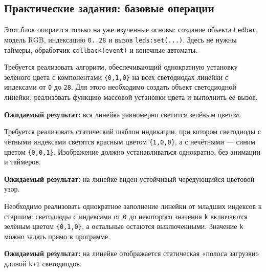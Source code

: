 \subsection{Практические задания: базовые операции}
Этот блок опирается только на уже изученные основы: создание объекта \verb|Ledbar|, модель RGB, индексацию \verb|0..28| и вызов \verb|leds:set(...)|. Здесь не нужны таймеры, обработчик \verb|callback(event)| и конечные автоматы.

\begin{taskbox}
\indent Требуется реализовать алгоритм, обеспечивающий однократную установку зелёного цвета с компонентами \verb|{0,1,0}| на всех светодиодах линейки с индексами от \verb|0| до \verb|28|. Для этого необходимо создать объект светодиодной линейки, реализовать функцию массовой установки цвета и выполнить её вызов.

\noindent\textbf{Ожидаемый результат:} вся линейка равномерно светится зелёным цветом.
\end{taskbox}

\begin{taskbox}
\indent Требуется реализовать статический шаблон индикации, при котором светодиоды с чётными индексами светятся красным цветом \verb|{1,0,0}|, а с нечётными --- синим цветом \verb|{0,0,1}|. Изображение должно устанавливаться однократно, без анимации и таймеров.

\noindent\textbf{Ожидаемый результат:} на линейке виден устойчивый чередующийся цветовой узор.
\end{taskbox}

\begin{taskbox}
\indent Необходимо реализовать однократное заполнение линейки от младших индексов к старшим: светодиоды с индексами от \verb|0| до некоторого значения \verb|k| включаются зелёным цветом \verb|{0,1,0}|, а остальные остаются выключенными. Значение \verb|k| можно задать прямо в программе.

\noindent\textbf{Ожидаемый результат:} на линейке отображается статическая «полоса загрузки» длиной \verb|k+1| светодиодов.
\end{taskbox}
